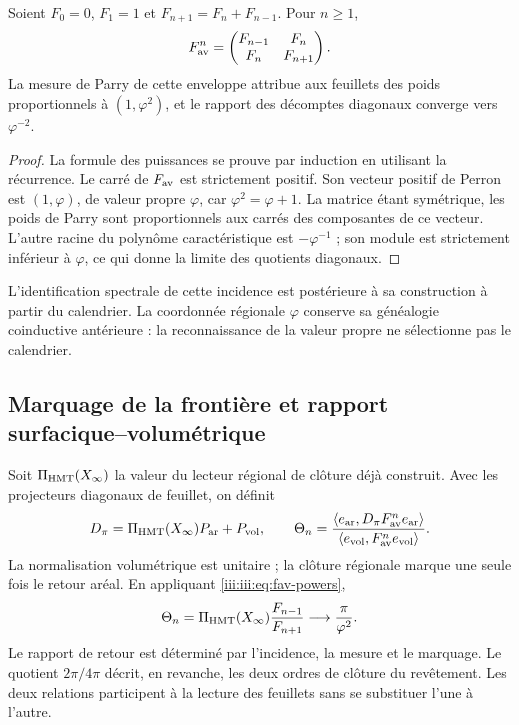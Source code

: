 \begin{proposition}
Soient $F_0=0$, $F_1=1$ et $F_{n+1}=F_n+F_{n-1}$. Pour $n\geq1$,
\begin{equation}
 F_{\rm av}^{n}=
 \begin{pmatrix}F_{n-1}&F_n\\F_n&F_{n+1}\end{pmatrix}.
 \label{iii:iii:eq:fav-powers}
\end{equation}
La mesure de Parry de cette enveloppe attribue aux feuillets des poids proportionnels à $(1,\varphi^2)$, et le rapport des décomptes diagonaux converge vers $\varphi^{-2}$.
\end{proposition}
\begin{proof}
La formule des puissances se prouve par induction en utilisant la récurrence.
Le carré de $F_{\rm av}$ est strictement positif. Son vecteur positif de
Perron est $(1,\varphi)$, de valeur propre $\varphi$, car
$\varphi^2=\varphi+1$. La matrice étant symétrique, les poids de Parry sont
proportionnels aux carrés des composantes de ce vecteur. L’autre racine
du polynôme caractéristique est $-\varphi^{-1}$ ; son module est strictement
inférieur à $\varphi$, ce qui donne la limite des quotients diagonaux.
\end{proof}

L’identification spectrale de cette incidence est postérieure à sa construction
à partir du calendrier. La coordonnée régionale $\varphi$ conserve sa généalogie
coinductive antérieure : la reconnaissance de la valeur propre ne sélectionne pas le calendrier.

\subsection{Marquage de la frontière et rapport surfacique--volumétrique}

Soit $\Pi_{\rm HMT}(X_\infty)$ la valeur du lecteur régional de clôture déjà construit. Avec les projecteurs diagonaux de feuillet, on définit
\begin{equation}
 D_\pi=\Pi_{\rm HMT}(X_\infty)P_{\rm ar}+P_{\rm vol},\qquad
 \Theta_n=
 \frac{\langle e_{\rm ar},D_\pi F_{\rm av}^{n}e_{\rm ar}\rangle}
 {\langle e_{\rm vol},F_{\rm av}^{n}e_{\rm vol}\rangle}.
 \label{iii:iii:eq:marked-return}
\end{equation}
La normalisation volumétrique est unitaire ; la clôture régionale marque une seule fois
le retour aréal. En appliquant \eqref{iii:iii:eq:fav-powers},
\begin{equation}
 \Theta_n=\Pi_{\rm HMT}(X_\infty)\frac{F_{n-1}}{F_{n+1}}
 \longrightarrow\frac{\pi}{\varphi^2}.
 \label{iii:iii:eq:av-limit}
\end{equation}
Le rapport de retour est déterminé par l'incidence, la mesure et le marquage. Le quotient $2\pi/4\pi$ décrit, en revanche, les deux ordres de clôture du revêtement. Les deux relations participent à la lecture des feuillets sans se substituer l'une à l'autre.

